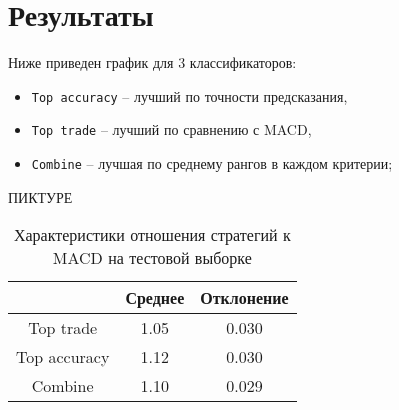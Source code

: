 \documentclass[pdftex,ptm,12pt,a4paper]{report}
\begin{document}
\section{Результаты}

Ниже приведен график для 3 классификаторов:

\begin{itemize}
\item \texttt{Top accuracy} -- лучший по точности предсказания,
\item \texttt{Top trade} -- лучший по сравнению с MACD,
\item \texttt{Combine} -- лучшая по среднему рангов в каждом критерии;
\end{itemize}

ПИКТУРЕ

\begin{table}[h]
\centering
\begin{tabular}{| c | c | c |}
\hline
 & Среднее & Отклонение \\ \hline
Top trade & 1.05 & 0.030 \\ \hline
Top accuracy & 1.12 & 0.030 \\ \hline
Combine & 1.10 & 0.029 \\ \hline
\end{tabular}
\caption{Характеристики отношения стратегий к MACD на тестовой выборке}
\end{table}

{}

\end{document}

